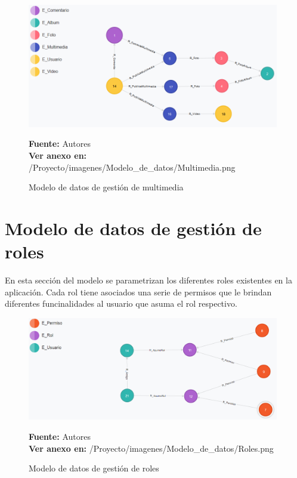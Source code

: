 \begin{figure}[!htb]
  \begin{center}
    \includegraphics[width=11cm]{./imagenes/Modelo_de_datos/Multimedia.png}
    \caption{Modelo de datos de gestión de multimedia}
    \label{fig:modelo_datos_gestion_multimedia}
    \textbf{Fuente:}  Autores \\
    \textbf{Ver anexo en:} /Proyecto/imagenes/Modelo\_de\_datos/Multimedia.png
  \end{center}
\end{figure}

\section{Modelo de datos de gestión de roles}

En esta sección del modelo se parametrizan los diferentes roles existentes en la aplicación. Cada rol tiene asociados una serie de permisos que le brindan diferentes funcinalidades al usuario que asuma el rol respectivo.

\begin{figure}[!htb]
  \begin{center}
    \includegraphics[width=11cm]{./imagenes/Modelo_de_datos/Roles.png}
    \caption{Modelo de datos de gestión de roles}
    \label{fig:modelo_datos_gestion_roles}
    \textbf{Fuente:}  Autores \\
    \textbf{Ver anexo en:} /Proyecto/imagenes/Modelo\_de\_datos/Roles.png
  \end{center}
\end{figure}